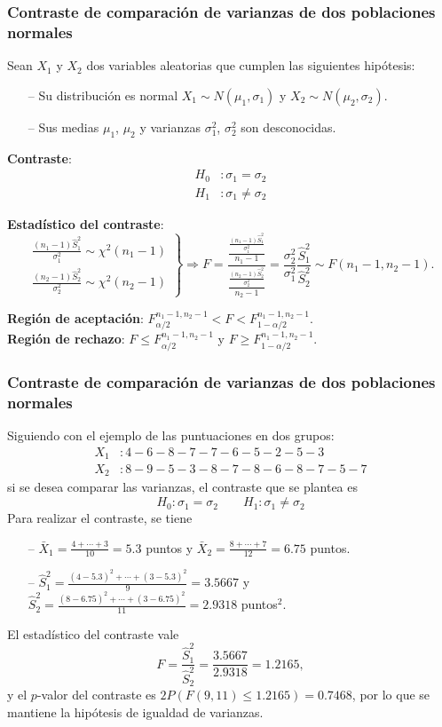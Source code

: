 \begin{frame}
\frametitle{Contraste de comparación de varianzas de dos poblaciones normales}
Sean $X_1$ y $X_2$ dos variables aleatorias que cumplen las siguientes hipótesis:
\begin{itemize}
\item[--] Su distribución es normal $X_1\sim N(\mu_1,\sigma_1)$ y $X_2\sim N(\mu_2,\sigma_2)$.
\item[--] Sus medias $\mu_1$, $\mu_2$ y varianzas $\sigma_1^2$, $\sigma_2^2$ son desconocidas.
\end{itemize}
\textbf{Contraste}:
\begin{align*}
H_0 &: \sigma_1=\sigma_2\\
H_1 &: \sigma_1\neq \sigma_2
\end{align*}

\textbf{Estadístico del contraste}:
\[
\left.
\begin{array}{l}
\displaystyle \frac{(n_1-1)\hat{S}_1^2}{\sigma_1^2}\sim \chi^2(n_1-1) \\
\displaystyle \frac{(n_2-1)\hat{S}_2^2}{\sigma_2^2}\sim \chi^2(n_2-1)
\end{array}
\right\}
\Rightarrow
F= \frac{\frac{\frac{(n_1-1)\hat{S}_1^2}{\sigma_1^2}}{n_1-1}}{\frac{\frac{(n_2-1)\hat{S}_2^2}{\sigma_2^2}}{n_2-1}} =
\frac{\sigma_2^2}{\sigma_1^2}\frac{\hat{S}_1^2}{\hat{S}_2^2}\sim F(n_1-1,n_2-1).
\]

\textbf{Región de aceptación}: $F^{n_1-1,n_2-1}_{\alpha/2}< F < F^{n_1-1,n_2-1}_{1-\alpha/2}$.\\
\textbf{Región de rechazo}: $F\leq F^{n_1-1,n_2-1}_{\alpha/2}$ y $F\geq F^{n_1-1,n_2-1}_{1-\alpha/2}$.
\end{frame}


\begin{frame}
\frametitle{Contraste de comparación de varianzas de dos poblaciones normales}
Siguiendo con el ejemplo de las puntuaciones en dos grupos:
\begin{align*}
X_1 &: 4 - 6 - 8 - 7 - 7 - 6 - 5 - 2 - 5 - 3 \\
X_2 &: 8 - 9 - 5 - 3 - 8 - 7 - 8 - 6 - 8 - 7 - 5 - 7
\end{align*}
si se desea comparar las varianzas, el contraste que se plantea es
\[
H_0: \sigma_1=\sigma_2\qquad H_1: \sigma_1\neq \sigma_2
\]
Para realizar el contraste, se tiene
\begin{itemize}
\item[--] $\bar{X}_1 = \frac{4+\cdots +3}{10}=5.3$ puntos y $\bar{X}_2=\frac{8+\cdots +7}{12}=6.75$ puntos.
\item[--] $\hat{S}_1^2= \frac{(4-5.3)^2+\cdots + (3-5.3)^2}{9}=3.5667$ y $\hat{S}_2^2= \frac{(8-6.75)^2+\cdots + (3-6.75)^2}{11}=2.9318$ puntos$^2$.
\end{itemize}
El estadístico del contraste vale
\[
F = \frac{\hat{S}_1^2}{\hat{S}_2^2} = \frac{3.5667}{2.9318}=1.2165,
\]
y el $p$-valor del contraste es $2P(F(9,11)\leq 1.2165)=0.7468$, por lo que se mantiene la hipótesis de igualdad de varianzas.
\end{frame}


